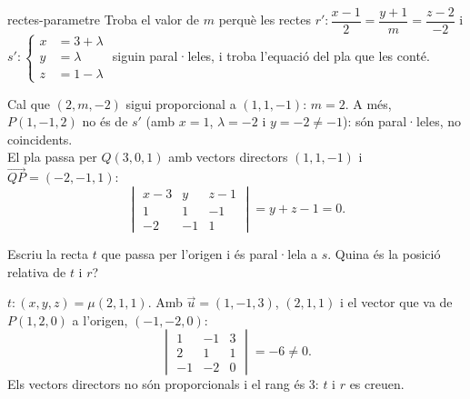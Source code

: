 \begin{apartats}
\begin{tria}{rectes-parametre}
Troba el valor de $m$ perquè les rectes
$r'\colon\dfrac{x-1}{2}=\dfrac{y+1}{m}=\dfrac{z-2}{-2}$ i
$s'\colon\left\{\begin{aligned}x&=3+\lambda\\y&=\lambda\\z&=1-\lambda\end{aligned}\right.$ siguin paral·leles,
i troba l'equació del pla que les conté.

\begin{solucio}
Cal que $(2,m,-2)$ sigui proporcional a $(1,1,-1)$: $m=2$. A més, $P(1,-1,2)$ no és de $s'$ (amb $x=1$,
$\lambda=-2$ i $y=-2\ne-1$): són paral·leles, no coincidents.\\
El pla passa per $Q(3,0,1)$ amb vectors directors $(1,1,-1)$ i $\overrightarrow{QP}=(-2,-1,1)$:
\[
\begin{vmatrix}x-3&y&z-1\\1&1&-1\\-2&-1&1\end{vmatrix}=y+z-1=0.
\]
\end{solucio}
\end{tria}

\begin{nomesllarg}
Escriu la recta $t$ que passa per l'origen i és paral·lela a $s$. Quina és la posició relativa de $t$ i
$r$?

\begin{solucio}
$t\colon (x,y,z)=\mu(2,1,1)$. Amb $\vec u=(1,-1,3)$, $(2,1,1)$ i el vector que va de $P(1,2,0)$ a
l'origen, $(-1,-2,0)$:
\[
\begin{vmatrix}1&-1&3\\2&1&1\\-1&-2&0\end{vmatrix}=-6\ne0.
\]
Els vectors directors no són proporcionals i el rang és 3: $t$ i $r$ es creuen.
\end{solucio}
\end{nomesllarg}

\end{apartats}

